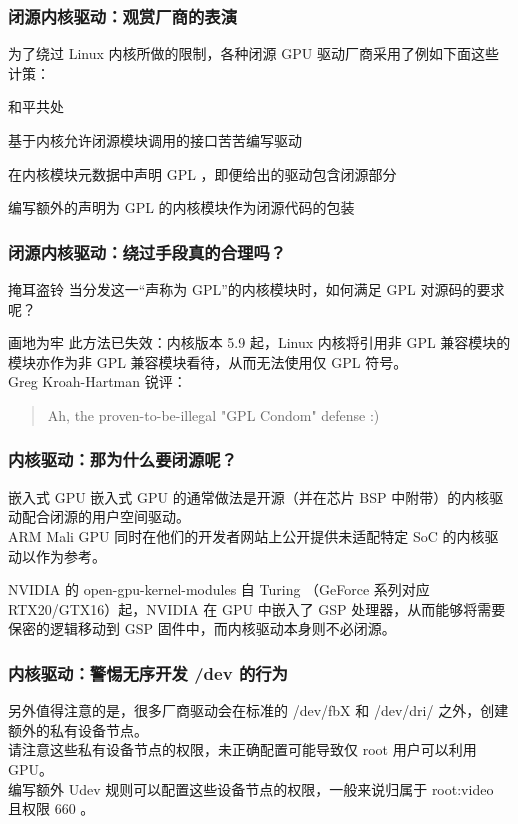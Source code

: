 \documentclass{ctexbeamer}
\begin{document}
\begin{frame}
    \frametitle{闭源内核驱动：观赏厂商的表演}
    为了绕过 Linux 内核所做的限制，各种闭源 GPU 驱动厂商采用了例如下面这些计策：\\
    \begin{labeling}{和平共处}
        \item [和平共处] 基于内核允许闭源模块调用的接口苦苦编写驱动
        \item [掩耳盗铃] 在内核模块元数据中声明 GPL ，即便给出的驱动包含闭源部分
        \item [画地为牢] 编写额外的声明为 GPL 的内核模块作为闭源代码的包装
    \end{labeling}
\end{frame}

\begin{frame}
    \frametitle{闭源内核驱动：绕过手段真的合理吗？}
    \begin{block}{掩耳盗铃}
        当分发这一“声称为 GPL”的内核模块时，如何满足 GPL 对源码的要求呢？
    \end{block}
    \begin{block}{画地为牢}
        此方法已失效：内核版本 5.9 起，Linux 内核将引用非 GPL 兼容模块的模块亦作为非 GPL 兼容模块看待，从而无法使用仅 GPL 符号。\\
        Greg Kroah-Hartman 锐评：
        \begin{quote}
            Ah, the proven-to-be-illegal "GPL Condom" defense :)
        \end{quote}
    \end{block}
\end{frame}

\begin{frame}
    \frametitle{内核驱动：那为什么要闭源呢？}
    \begin{block}{嵌入式 GPU}
        嵌入式 GPU 的通常做法是开源（并在芯片 BSP 中附带）的内核驱动配合闭源的用户空间驱动。\\
        ARM Mali GPU 同时在他们的开发者网站上公开提供未适配特定 SoC 的内核驱动以作为参考。
    \end{block}
    \begin{block}{NVIDIA 的 open-gpu-kernel-modules}
        自 Turing （GeForce 系列对应 RTX20/GTX16）起，NVIDIA 在 GPU 中嵌入了 GSP 处理器，从而能够将需要保密的逻辑移动到 GSP 固件中，而内核驱动本身则不必闭源。
    \end{block}
\end{frame}

\begin{frame}
    \frametitle{内核驱动：警惕无序开发 /dev 的行为}
    另外值得注意的是，很多厂商驱动会在标准的 /dev/fbX 和 /dev/dri/ 之外，创建额外的私有设备节点。\\
    请注意这些私有设备节点的权限，未正确配置可能导致仅 root 用户可以利用 GPU。\\
    编写额外 Udev 规则可以配置这些设备节点的权限，一般来说归属于 root:video 且权限 660 。
\end{frame}
\end{document}
